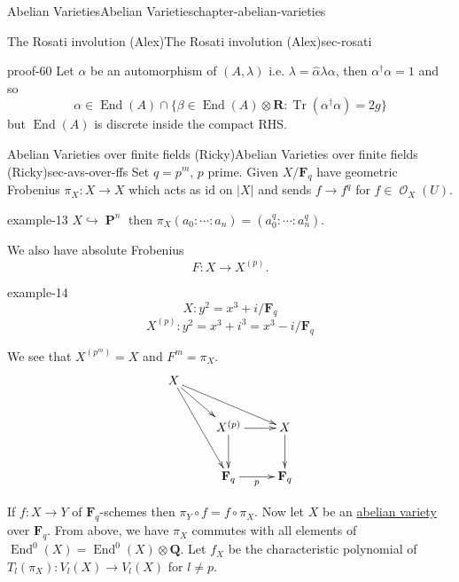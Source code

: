 \documentclass[oneside,10pt,]{book}
\numberwithin{equation}{section}
\newcommand{\sheaf}[1]{\operatorname{\mathcal{#1}}}
\newcommand{\QQ}{\mathbf{Q}}
\newcommand{\RR}{\mathbf{R}}
\newcommand{\FF}{\mathbf{F}}
\newcommand{\id}{\mathrm{id}}
\DeclareMathOperator{\End}{End}
\DeclareMathOperator{\PP}{\mathbf{P}}
\DeclareMathOperator{\trace}{Tr}
\begin{document}
\begin{chapterptx}{Abelian Varieties}{}{Abelian Varieties}{}{}{chapter-abelian-varieties}
\begin{sectionptx}{The Rosati involution (Alex)}{}{The Rosati involution (Alex)}{}{}{sec-rosati}
\begin{proofptx}{}{proof-60}
Let \(\alpha\) be an automorphism of \((A, \lambda)\) i.e. \(\lambda =\hat \alpha  \lambda \alpha\), then \(\alpha^\dagger \alpha= 1\) and so%
\begin{equation*}
\alpha \in \End(A)\cap \{\beta \in \End(A) \otimes \RR: \trace(\alpha^\dagger \alpha) = 2g\}
\end{equation*}
but \(\End(A)\) is discrete inside the compact RHS.%
\end{proofptx}
\end{sectionptx}
%
%
\typeout{************************************************}
\typeout{************************************************}
%
\begin{sectionptx}{Abelian Varieties over finite fields (Ricky)}{}{Abelian Varieties over finite fields (Ricky)}{}{}{sec-avs-over-ffs}
\hypertarget{p-356}{}%
Set \(q = p^m\), \(p\) prime. Given \(X/\FF_q\) have  geometric Frobenius \(\pi_X\colon X \to X\) which acts as \(\id\) on \(|X|\) and sends \(f\to f^q\) for \(f\in \sheaf O_X(U)\).%
\begin{example}{}{example-13}%
\hypertarget{p-357}{}%
\(X \hookrightarrow \PP^n\) then \(\pi_X(a_0:\cdots :a_n) = (a_0^q : \cdots :a_n^q)\).%
\end{example}
\hypertarget{p-358}{}%
We also have absolute Frobenius%
\begin{equation*}
F\colon X\to X^{(p)}\text{.}
\end{equation*}
%
\begin{example}{}{example-14}%
\hypertarget{p-359}{}%
%
\begin{equation*}
X \colon y^2 = x^3 + i / \FF_q
\end{equation*}
%
\begin{equation*}
X^{(p)} \colon y^2 = x^3 + i^3 = x^3 - i / \FF_q
\end{equation*}
%
\end{example}
\hypertarget{p-360}{}%
We see that \(X^{(p^m)} = X\) and \(F^m = \pi_X\).%
\begin{equation*}
\xymatrix{
X \ar[drr] \ar[dr]\ar[ddr] & &\\
& X^{(p)} \ar[d]\ar[r] & X\ar[d]\\
& \FF_q \ar[r]_p &\FF_q
}
\end{equation*}
%
\par
\hypertarget{p-361}{}%
If \(f\colon X \to Y\) of \(\FF_q\)-schemes then \(\pi_Y \circ f = f\circ \pi_X\). Now let \(X\) be an \hyperref[def-buntes-abvar]{abelian variety} over \(\FF_q\). From above, we have \(\pi_X\) commutes with all elements of \(\End^0(X) = \End^0(X)\otimes \QQ\). Let \(f_X\) be the characteristic polynomial of \(T_l(\pi_X) \colon V_l(X) \to V_l(X)\) for \(l \ne p\).%

\end{sectionptx}
\end{chapterptx}
\end{document}

